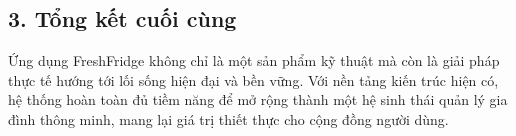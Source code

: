\subsection*{3. Tổng kết cuối cùng}
Ứng dụng FreshFridge không chỉ là một sản phẩm kỹ thuật mà còn là giải pháp thực tế hướng tới lối sống hiện đại và bền vững. Với nền tảng kiến trúc hiện có, hệ thống hoàn toàn đủ tiềm năng để mở rộng thành một hệ sinh thái quản lý gia đình thông minh, mang lại giá trị thiết thực cho cộng đồng người dùng.